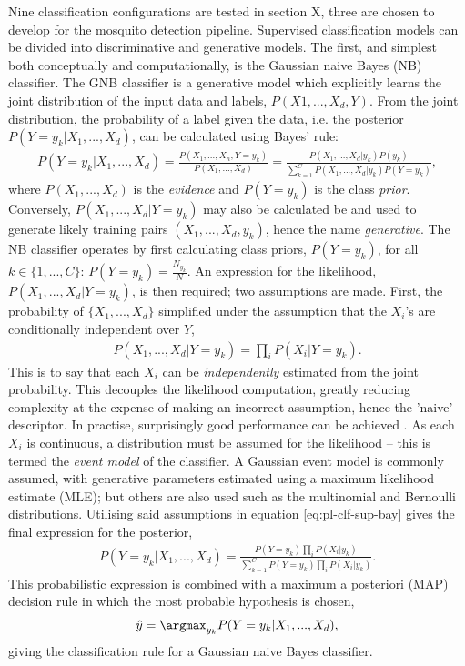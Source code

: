         Nine classification configurations are tested in section X, three are chosen to develop for the mosquito detection pipeline. Supervised classification models can be divided into discriminative and generative models.  The first, and simplest both conceptually and computationally, is the  Gaussian naive Bayes (NB) classifier. The GNB classifier is a generative model which explicitly learns the joint distribution of the input data and labels, $P(X1,...,X_d,Y)$. From the joint distribution, the probability of a label given the data, i.e. the posterior $P(Y=y_k|X_1,...,X_d)$, can be calculated using Bayes' rule:
        \begin{align}
            P(Y=y_k|X_1,...,X_d) = \frac{P(X_1,...,X_n,Y=y_k)}{P(X_1,...,X_d)} = \frac{P(X_1,...,X_d|y_k)P(y_k)}{\sum^{C}_{k=1}P(X_1,...,X_d|y_k)P(Y=y_k)},
            \label{eq:pl-clf-sup-bay}
        \end{align}
        where $P(X_1,...,X_d)$ is the \textit{evidence} and $P(Y=y_k)$ is the class \textit{prior}. Conversely, $P(X_1,...,X_d|Y=y_k)$ may also be calculated be and used to generate likely training pairs $(X_1,...,X_d,y_k)$, hence the name \textit{generative}. The NB classifier operates by first calculating class priors, $P(Y=y_k)$, for all $k\in\{1,...,C\}$: $P(Y=y_k) = \frac{N_{y_k}}{N}$.
        An expression for the likelihood, $P(X_1,...,X_d|Y=y_k)$, is then required; two assumptions are made. First, the probability of $\{X_1,...,X_d\}$ simplified under the assumption that the $X_i$'s are conditionally independent over $Y$,
        \begin{align}
            P(X_1,...,X_d|Y=y_k) = \prod_iP(X_i|Y=y_k).
        \end{align}
        This is to say that each $X_i$ can be \textit{independently} estimated from the joint probability. This decouples the likelihood computation, greatly reducing complexity at the expense of making an incorrect assumption, hence the 'naive' descriptor. In practise, surprisingly good performance can be achieved \cite{Friedman1997}. As each $X_i$ is continuous, a distribution must be assumed for the likelihood -- this is termed the \textit{event model} of the classifier\cite{Mccallum}. A Gaussian event model is commonly assumed, with generative parameters estimated using a maximum likelihood estimate (MLE); but others are also used such as the multinomial and Bernoulli distributions.
        Utilising said assumptions in equation \ref{eq:pl-clf-sup-bay} gives the final expression for the posterior,
        \begin{align}
            P(Y=y_k|X_1,...,X_d) = \frac{P(Y=y_k)\prod_iP(X_i|y_k)}{\sum^{C}_{k=1}P(Y=y_k)\prod_iP(X_i|y_k)}.
        \end{align}
        This probabilistic expression is combined with a maximum a posteriori (MAP) decision rule in which the most probable hypothesis is chosen,
        \begin{align}
            \hat{y} = \argmax_{y_k}P(Y=y_k|X_1,...,X_d),
        \end{align}
        giving the classification rule for a Gaussian naive Bayes classifier.
        
